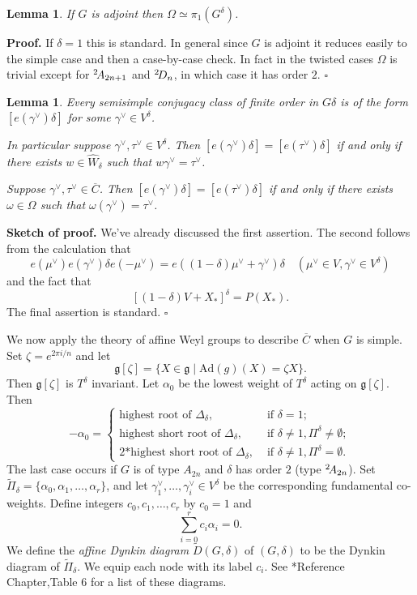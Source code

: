 \documentclass[10pt,leqno]{article}
\newtheorem{lemma}[equation]{Lemma}
\newcommand{\qed}{\hfill $\square$ \medskip}
\newenvironment{proof}[1][Proof]{\noindent\textbf{#1.} }{\qed}
\newcommand{\Ad}{\text{Ad}}
\newcommand{\ch}[1]{#1^\vee}
\newcommand{\g}{\mathfrak g}
\newcommand\wt{\widetilde}
\newcommand\wh{\widehat}
\newcommand{\Daffine}{\wt D(G,\delta)}
\newcommand{\twoAeven}{\phantom{}^2\negthinspace A_{2n}}
\newcommand{\twoAodd}{\phantom{}^2\negthinspace A_{2n+1}}
\newcommand{\twoD}{\phantom{}^2\negthinspace D_{n}}
\begin{document}
\begin{lemma}
\label{l:Omega}
If $G$ is adjoint then $\Omega\simeq \pi_1(G^\delta)$.
\end{lemma}

\begin{proof}
If $\delta=1$ this is standard. In general since $G$ is adjoint it
reduces easily to the simple case and then a case-by-case check. In
fact in the twisted cases $\Omega$ is trivial except for $\twoAodd$ and $\twoD$, in which case it has order $2$.
\end{proof}



\begin{lemma}
\label{l:kac1}
Every semisimple conjugacy class of finite order in $G\delta$ is of
the form $[e(\ch\gamma)\delta]$ for some $\ch\gamma\in V^\delta$.
  
In particular suppose $\ch\gamma,\ch\tau\in V^\delta$.  Then $[e(\ch\gamma)\delta]=[e(\ch\tau)\delta]$ if and only if there exists $w\in \wh W_\delta$
such that $w\ch\gamma=\ch\tau$.

Suppose $\ch\gamma,\ch\tau\in \overline C$. Then
$[e(\ch\gamma)\delta]=[e(\ch\tau)\delta]$ if and only if there exists
$\omega\in \Omega$ such that $\omega(\ch\gamma)=\ch\tau$.

\end{lemma}

\begin{proof}[Sketch of proof]
We've already discussed the first assertion. The second follows from
the calculation that
$$
e(\ch\mu)e(\ch\gamma)\delta e(-\ch\mu)=e((1-\delta)\ch\mu+\ch\gamma)\delta\quad (\ch\mu\in V,\ch\gamma\in V^\delta)
$$
and the fact that
$$
[(1-\delta)V+X_*]^\delta=P(X_*).
$$
The final assertion is standard.
\end{proof}

We now apply the  theory of  affine Weyl groups to describe $\overline C$
when $G$ is simple.
Set $\zeta=e^{2\pi i/n}$ and let
$$
\g[\zeta]=\{X\in \g\mid \Ad(g)(X)=\zeta X\}.
$$
Then $\g[\zeta]$ is $T^\delta$ invariant. Let $\alpha_0$ be the lowest weight of $T^\delta$ acting on $\g[\zeta]$.
Then
$$
-\alpha_0=
\begin{cases}
  \text{highest root of }\Delta_\delta, &\text{ if } \delta=1;\\
  \text{highest short root of }\Delta_\delta, &\text{ if }\delta\ne 1,\Pi^\delta\ne\emptyset;\\
  \text{2*highest short root of }\Delta_\delta, &\text{ if }\delta\ne 1,\Pi^\delta=\emptyset.
\end{cases}
$$
The last case occurs if $G$ is of type $A_{2n}$ and $\delta$ has order $2$ (type $\twoAeven$).
Set $\wt\Pi_\delta=\{\alpha_0,\alpha_1,\dots,\alpha_r\}$,
and let $\ch\gamma_1,\dots,\ch\gamma_i\in V^\delta$ be the corresponding fundamental co-weights.
Define integers $c_0,c_1,\dots, c_r$ by $c_0=1$ and 
$$
\sum_{i=0}^r c_i\alpha_i=0.
$$
We define the {\it affine Dynkin diagram}  $\Daffine$ of $(G,\delta)$ to be the
Dynkin diagram of $\wt\Pi_\delta$. We equip each node with its label $c_i$.
See \cite{ov}*{Reference Chapter,Table 6} for a list of these diagrams.
\end{document}

